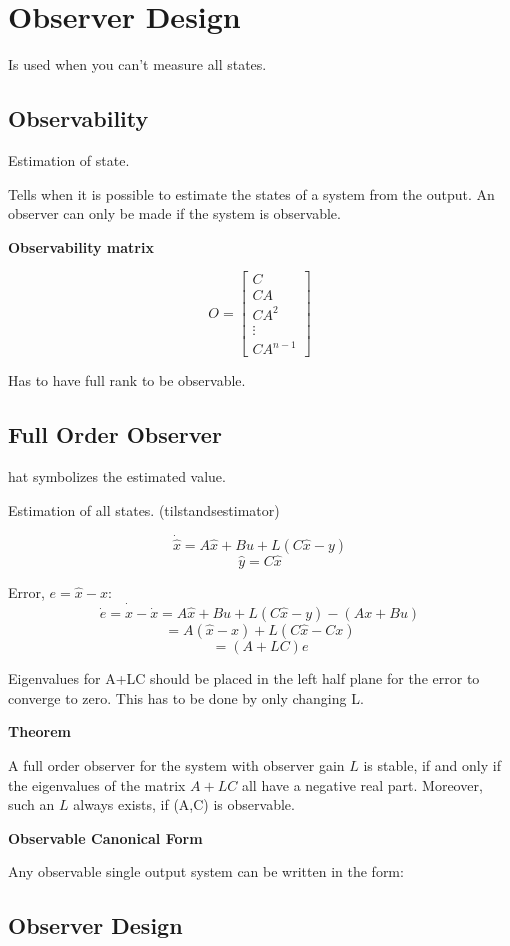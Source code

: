 \section{Observer Design}
Is used when you can't measure all states.

\subsection{Observability}
Estimation of state.

Tells when it is possible to estimate the states of a system from the output.
An observer can only be made if the system is observable.


\textbf{Observability matrix}

$$O = \begin{bmatrix} C \\ CA \\ CA^2 \\ \vdots \\ CA^{n-1} \end{bmatrix}$$

Has to have full rank to be observable.


\subsection{Full Order Observer}
hat symbolizes the estimated value.

Estimation of all states. (tilstandsestimator)

$$\dot{\hat{x}} = A\hat{x} + Bu + L(C\hat{x}-y)$$
$$\hat{y} = C\hat{x}$$

Error, $e = \hat{x} - x$:
$$\dot{e} = \dot{\hat{x}} - \dot{x} = A\hat{x}+Bu+L(C\hat{x} - y) - (Ax+Bu) $$
$$ = A(\hat{x}-x) + L(C\hat{x}-Cx)$$
$$ = (A+LC)e$$

Eigenvalues for A+LC should be placed in the left half plane for the error to converge to zero.
This has to be done by only changing L.

\textbf{Theorem}

A full order observer for the system with observer gain $L$ is stable,
if and only if the eigenvalues of the matrix $A+LC$ all have a negative real part.
Moreover, such an $L$ always exists, if (A,C) is observable.


\textbf{Observable Canonical Form}

Any observable single output system can be written in the form:



\subsection{Observer Design}

